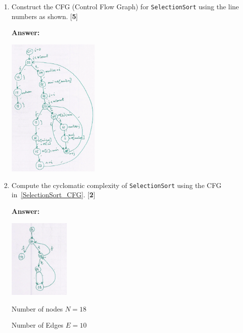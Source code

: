 \documentclass{article}
\begin{document}
\begin{enumerate}
\item \label{SelectionSort_CFG} Construct the CFG (Control Flow Graph) for \texttt{SelectionSort} using the line numbers as shown. [{\bf 5}]
\begin{framed}
{\bf Answer:}

{\includegraphics[width=4.5cm]{Images/SelectionSortCFG.png}}
\end{framed}
\newpage
\item \label{SelectionSort_Cyclomatic_Complexity} Compute the cyclomatic complexity of \texttt{SelectionSort} using the CFG in~\ref{SelectionSort_CFG}. [{\bf 2}]
\begin{framed}
{\bf Answer:}

{\includegraphics[width=3cm]{Images/CyclomaticComplexity.png}}

Number of nodes $N=18$

Number of Edges $E=10$


\end{framed}
\end{enumerate}
\end{document}
